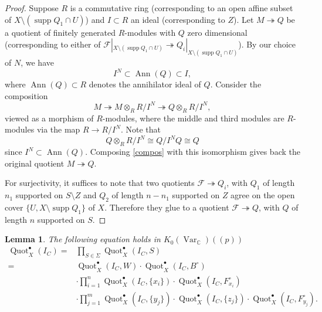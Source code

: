 \documentclass[12pt]{amsart}
\newtheorem{lemma}[theorem]{Lemma}
\theoremstyle{definition}
\newcommand{\CC} {\mathbb{C}}          %
\newcommand{\Quot}{\operatorname{Quot}}
\newcommand{\Ann}{\operatorname{Ann}}
\newcommand{\Var}{\operatorname{Var}}
\newcommand{\supp}{\operatorname{supp}}
\newcommand{\F}{\mathcal{F}}
\begin{document}
\begin{proof}
Suppose $R$ is a commutative ring (corresponding to an open affine 
subset of $X \setminus (\supp Q_1 \cap U)$) and $I \subset R$ an ideal 
(corresponding to $Z$). Let $M \twoheadrightarrow Q$ be a quotient of 
finitely generated $R$-modules with $Q$ zero dimensional (corresponding 
to either of $\F|_{X \setminus (\supp Q_1 \cap U)} \twoheadrightarrow 
Q_i|_{X \setminus (\supp Q_1 \cap U)}$). By our choice of $N$, we have
$$
I^N \subset \Ann(Q) \subset I,
$$
where $\Ann(Q) \subset R$ denotes the annihilator ideal of $Q$. 
Consider the composition
\begin{equation} \label{compos}
M \twoheadrightarrow M \otimes_R R / I^N \twoheadrightarrow Q 
\otimes_R R / I^N,
\end{equation}
viewed as a morphism of $R$-modules, where the middle and third 
modules are $R$-modules via the map $R \rightarrow R / I^N$. Note 
that 
\[
Q \otimes_R R / I^N \cong Q / I^N Q \cong Q
\] 
since $I^N \subset \Ann(Q)$. Composing \eqref{compos} with this 
isomorphism gives back the original quotient $M \twoheadrightarrow Q$.

For surjectivity, it suffices to note that two quotients $\F \twoheadrightarrow 
Q_i$, with $Q_1$ of length $n_1$ supported on $S \setminus Z$ and $Q_2$ 
of length $n-n_1$ supported on $Z$ agree on the open cover $\{ U, X 
\setminus \supp Q_1\}$ of $X$. Therefore they glue to a quotient $\F 
\twoheadrightarrow Q$, with $Q$ of length $n$ supported on $S$.
\end{proof}

\begin{lemma}\label{lem: Sigma = product of local Hilbert schemes}
The following equation holds in $K_{0}(\Var_{\CC})(\!(p)\!)$
\begin{align*}
\Quot_X^{\bullet}(I_C) = &\prod_{S \in \Sigma} \Quot_X^{\bullet}(I_C,S) \\
=&\Quot_X^{\bullet}(I_C,W) \cdot
\Quot_X^{\bullet}(I_C,B^\circ) \\
&\cdot \prod_{i=1}^{n}
\Quot_X^{\bullet}(I_C,\{x_i\}) \cdot
\Quot_X^{\bullet}(I_C,F_{x_i}^\circ) \\
&\cdot \prod_{j=1}^{m}
\Quot_X^{\bullet}(I_C,\{y_j\}) \cdot
\Quot_X^{\bullet}(I_C,\{z_j\}) \cdot
\Quot_X^{\bullet}(I_C,F^\circ_{y_j}).
\end{align*}
\end{lemma}
\end{document}
